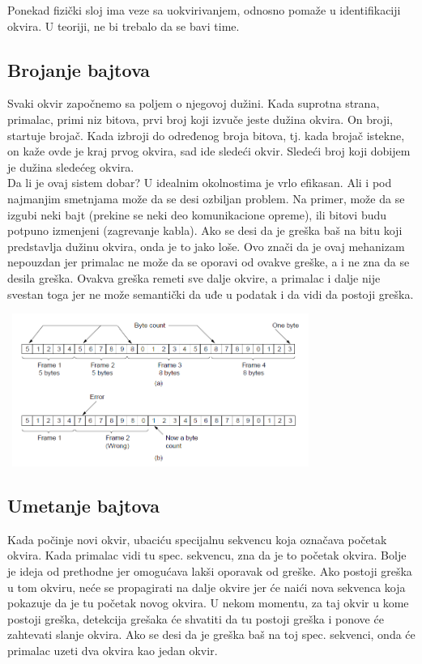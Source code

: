 \documentclass{article} %
\begin{document}
Ponekad fizički sloj ima veze sa uokvirivanjem, odnosno pomaže u identifikaciji okvira. U teoriji, ne bi trebalo da se bavi time.
\subsection{Brojanje bajtova}
Svaki okvir započnemo sa poljem o njegovoj dužini. Kada suprotna strana, primalac, primi niz bitova, prvi broj koji izvuče jeste dužina okvira. On broji, startuje brojač. Kada izbroji do određenog broja bitova, tj. kada brojač istekne, on kaže ovde je kraj prvog okvira, sad ide sledeći okvir. Sledeći broj koji dobijem je dužina sledećeg okvira.\\
Da li je ovaj sistem dobar? U idealnim okolnostima je vrlo efikasan. Ali i pod najmanjim smetnjama može da se desi ozbiljan problem. Na primer, može da se izgubi neki bajt (prekine se neki deo komunikacione opreme), ili bitovi budu potpuno izmenjeni (zagrevanje kabla). Ako se desi da je greška baš na bitu koji predstavlja dužinu okvira, onda je to jako loše. Ovo znači da je ovaj mehanizam nepouzdan jer primalac ne može da se oporavi od ovakve greške, a i ne zna da se desila greška. Ovakva greška remeti sve dalje okvire, a primalac i dalje nije svestan toga jer ne može semantički da uđe u podatak i da vidi da postoji greška.
\begin{center}
\includegraphics[width=10cm, height=5cm]{brojanjeBajtova}\\
\end{center}
\subsection{Umetanje bajtova}
Kada počinje novi okvir, ubaciću specijalnu sekvencu koja označava početak okvira. Kada primalac vidi tu spec. sekvencu, zna da je to početak okvira. Bolje je ideja od prethodne jer omogućava lakši oporavak od greške. Ako postoji greška u tom okviru, neće se propagirati na dalje okvire jer će naići nova sekvenca koja pokazuje da je tu početak novog okvira. U nekom momentu, za taj okvir u kome postoji greška, detekcija grešaka će shvatiti da tu postoji greška i ponove će zahtevati slanje okvira. Ako se desi da je greška baš na toj spec. sekvenci, onda će primalac uzeti dva okvira kao jedan okvir.  \\
\end{document}
